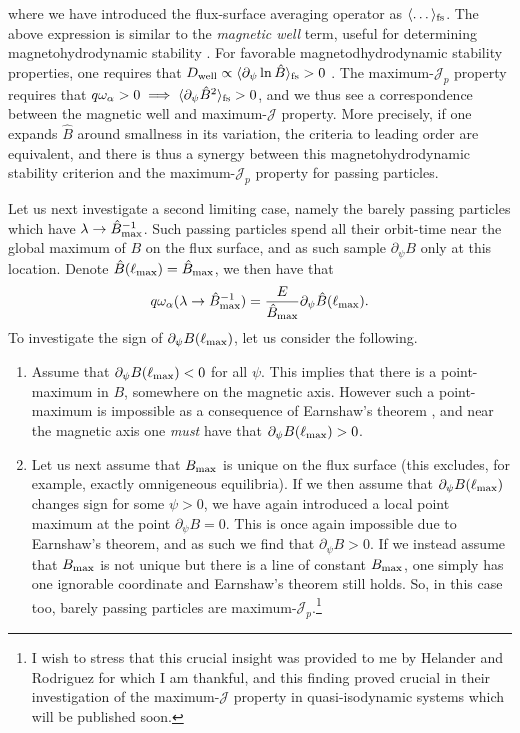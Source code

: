 where we have introduced the flux-surface averaging operator as $\langle \dots \rangle_{\rm fs}$. The above expression is similar to the \textit{magnetic well} term, useful for determining magnetohydrodynamic stability \cite{greene1997brief,landreman2020magnetic,rodriguez2023magnetohydrodynamic}. For favorable magnetodhydrodynamic stability properties, one requires that $D_{\rm well} \propto \langle \partial_\psi \ln \hat{B} \rangle_{\rm fs} > 0$ \cite{helander2014theory}. The maximum-$\mathcal{J}_p$ property requires that $q \omega_\alpha >0 \implies \langle \partial_\psi \hat{B}^2 \rangle_{\rm fs} > 0$, and we thus see a correspondence between the magnetic well and maximum-$\mathcal{J}$ property. More precisely, if one expands $\hat{B}$ around smallness in its variation, the criteria to leading order are equivalent, and there is thus a synergy between this magnetohydrodynamic stability criterion and the maximum-$\mathcal{J}_p$ property for passing particles. \par 
Let us next investigate a second limiting case, namely the barely passing particles which have $\lambda \rightarrow \hat{B}_{\rm  max}^{-1}$. Such passing particles spend all their orbit-time near the global maximum of $B$ on the flux surface, and as such sample $\partial_\psi B$ only at this location. Denote $\hat{B}(\ell_{\rm max}) = \hat{B}_{\rm max}$, we then have that
\begin{equation}
    q \omega_\alpha (\lambda \rightarrow \hat{B}_{\rm  max}^{-1}) = \frac{E}{\hat{B}_{\rm max}} \partial_\psi \hat{B}(\ell_{\rm max}).
\end{equation}
To investigate the sign of $\partial_\psi B(\ell_{\rm max})$, let us consider the following. 
\begin{enumerate}
    \item Assume that $\partial_\psi B(\ell_{\rm max}) < 0 $ for all $\psi$. This implies that there is a point-maximum in $B$, somewhere on the magnetic axis. However such a point-maximum  is impossible as a consequence of Earnshaw's theorem \cite{earnshaw1848nature}, and near the magnetic axis one {\it must} have that $\partial_\psi B(\ell_{\rm max}) > 0$.
    \item Let us next assume that $B_{\rm max}$ is unique on the flux surface (this excludes, for example, exactly omnigeneous equilibria). If we then assume that $\partial_\psi B(\ell_{\rm max})$ changes sign for some $\psi > 0$, we have again introduced a local point maximum at the point $\partial_\psi B = 0$. This is once again impossible due to Earnshaw's theorem, and as such we find that $\partial_\psi B > 0 $. If we instead assume that $B_{\rm max}$ is not unique but there is a line of constant $B_{\rm max}$, one simply has one ignorable coordinate and Earnshaw's theorem still holds. So, in this case too, barely passing particles are maximum-$\mathcal{J}_p$.\footnote{I wish to stress that this crucial insight was provided to me by Helander and Rodriguez for which I am thankful, and this finding proved crucial in their investigation of the maximum-$\mathcal{J}$ property in quasi-isodynamic systems which will be published soon.}
\end{enumerate}
